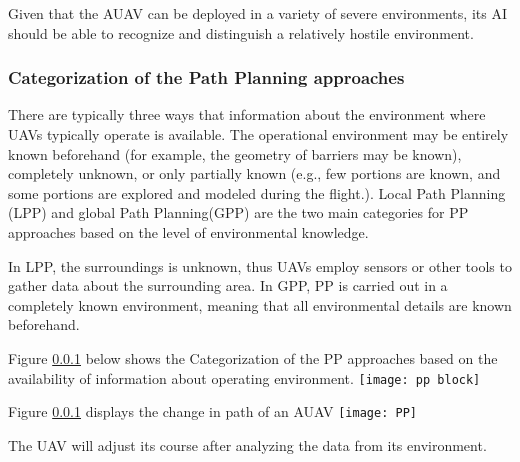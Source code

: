 \begin{fullwidth}
 Given that the AUAV can be deployed in a variety of severe environments, its AI should be able to recognize and distinguish a relatively hostile environment.
 
 \subsubsection{Categorization of the Path Planning approaches}
 There are typically three ways that information about the environment where UAVs typically operate is available. The operational environment may be entirely known beforehand (for example, the geometry of barriers may be known), completely unknown, or only partially known (e.g., few portions are known, and some portions are explored and modeled during the flight.). Local Path Planning (LPP) and global Path Planning(GPP) are the two main categories for PP approaches based on the level of environmental knowledge. 
 
 In LPP, the surroundings is unknown, thus UAVs employ sensors or other tools to gather data about the surrounding area. In GPP, PP is carried out in a completely known environment, meaning that all environmental details are known beforehand.
 
 \begin{center}
    Figure \ref{} below shows the Categorization of the PP approaches based on the availability of information about operating environment.
     \texttt{[image: pp block]}
 \end{center}
 \hspace{1cm}
 \begin{center}
    Figure \ref{} displays the change in path of an AUAV
     \texttt{[image: PP]}
    \end{center}
 The UAV will adjust its course after analyzing the data from its environment.
\end{fullwidth}

